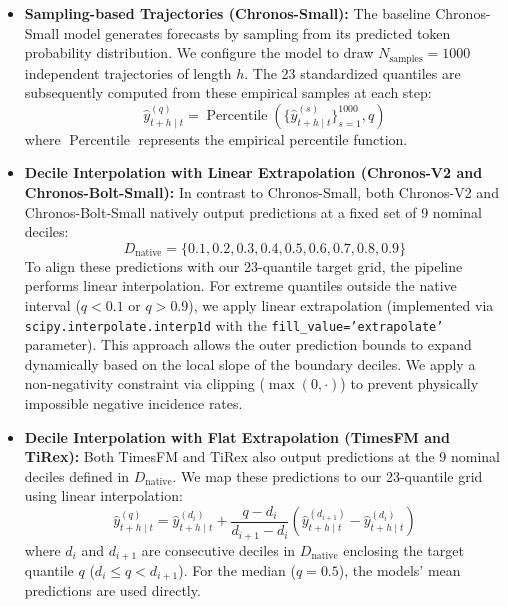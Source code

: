 \begin{itemize}
    \item \textbf{Sampling-based Trajectories (Chronos-Small):} The baseline Chronos-Small model generates forecasts by sampling from its predicted token probability distribution. We configure the model to draw $N_{\text{samples}}=1000$ independent trajectories of length $h$. The 23 standardized quantiles are subsequently computed from these empirical samples at each step:
    \begin{equation}
    \hat{y}_{t+h\mid t}^{(q)} = \operatorname{Percentile}\left(\{\hat{y}_{t+h\mid t}^{(s)}\}_{s=1}^{1000}, q\right)
    \end{equation}
    where $\operatorname{Percentile}$ represents the empirical percentile function.
    
    \item \textbf{Decile Interpolation with Linear Extrapolation (Chronos-V2 and Chronos-Bolt-Small):} In contrast to Chronos-Small, both Chronos-V2 and Chronos-Bolt-Small natively output predictions at a fixed set of 9 nominal deciles:
    \begin{equation}
    D_{\text{native}} = \{0.1, 0.2, 0.3, 0.4, 0.5, 0.6, 0.7, 0.8, 0.9\}
    \end{equation}
    To align these predictions with our 23-quantile target grid, the pipeline performs linear interpolation. For extreme quantiles outside the native interval ($q < 0.1$ or $q > 0.9$), we apply linear extrapolation (implemented via \texttt{scipy.interpolate.interp1d} with the \texttt{fill\_value='extrapolate'} parameter). This approach allows the outer prediction bounds to expand dynamically based on the local slope of the boundary deciles. We apply a non-negativity constraint via clipping ($\max(0, \cdot)$) to prevent physically impossible negative incidence rates.

    \item \textbf{Decile Interpolation with Flat Extrapolation (TimesFM and TiRex):} Both TimesFM and TiRex also output predictions at the 9 nominal deciles defined in $D_{\text{native}}$. We map these predictions to our 23-quantile grid using linear interpolation:
    \begin{equation}
    \hat{y}_{t+h\mid t}^{(q)} = \hat{y}_{t+h\mid t}^{(d_i)} + \frac{q - d_i}{d_{i+1} - d_i} \left( \hat{y}_{t+h\mid t}^{(d_{i+1})} - \hat{y}_{t+h\mid t}^{(d_i)} \right)
    \end{equation}
    where $d_i$ and $d_{i+1}$ are consecutive deciles in $D_{\text{native}}$ enclosing the target quantile $q$ ($d_i \le q < d_{i+1}$). For the median ($q=0.5$), the models' mean predictions are used directly.


\end{itemize}
